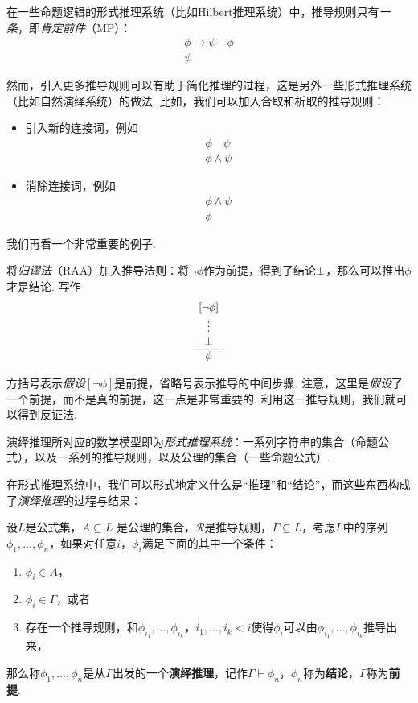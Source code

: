 在一些命题逻辑的形式推理系统（比如Hilbert推理系统）中，推导规则只有\textit{一条}，即\textit{肯定前件}（MP）：
\[\begin{array}{c}
        \phi\to\psi\quad\phi  \\\hline
        \psi
\end{array}\]

然而，引入更多推导规则可以有助于简化推理的过程，这是另外一些形式推理系统（比如自然演绎系统）的做法. 比如，我们可以加入合取和析取的推导规则：
\begin{itemize}
    \item 引入新的连接词，例如
    \[\begin{array}{c}
         \phi\quad\psi  \\\hline
         \phi\wedge\psi
    \end{array}\]
    \item 消除连接词，例如
    \[\begin{array}{c}
        \phi\wedge\psi  \\\hline
        \phi
   \end{array}\]
\end{itemize}
    
我们再看一个非常重要的例子. 

\begin{example}
将\textit{归谬法}（RAA）加入推导法则：将$\neg\phi$作为前提，得到了结论$\bot$，那么可以推出$\phi$才是结论. 写作
    \[\begin{array}{c}
         [\neg\phi]  \\
         \vdots\\
         \bot\\\hline
         \phi
    \end{array}\]

方括号表示\textit{假设}$[\neg\phi]$是前提，省略号表示推导的中间步骤. 注意，这里是\textit{假设}了一个前提，而不是真的前提，这一点是非常重要的. 利用这一推导规则，我们就可以得到反证法. 
\end{example}


演绎推理所对应的数学模型即为\textit{形式推理系统}：一系列字符串的集合（命题公式），以及一系列的推导规则，以及公理的集合（一些命题公式）. 

在形式推理系统中，我们可以形式地定义什么是“推理”和“结论”，而这些东西构成了\textit{演绎推理}的过程与结果：

\begin{definition}[演绎推理]
设$L$是公式集，$A\subseteq L$ 是公理的集合，$\mathcal R$是推导规则，$\Gamma\subseteq L$，考虑$L$中的序列$\phi_1,\dots,\phi_n$，如果对任意$i$，$\phi_i$满足下面的其中一个条件：
\begin{enumerate}
    \item $\phi_i\in A$，
    \item $\phi_i\in\Gamma$，或者
    \item 存在一个推导规则，和$\phi_{i_1},\dots,\phi_{i_k}$，$i_1,\dots,i_k<i$使得$\phi_i$可以由$\phi_{i_1},\dots,\phi_{i_k}$推导出来，
\end{enumerate}
那么称$\phi_1,\dots,\phi_n$是从$\Gamma$出发的一个\textbf{演绎推理}，记作$\Gamma\vdash\phi_n$，$\phi_n$称为\textbf{结论}，$\Gamma$称为\textbf{前提}.
\end{definition}


